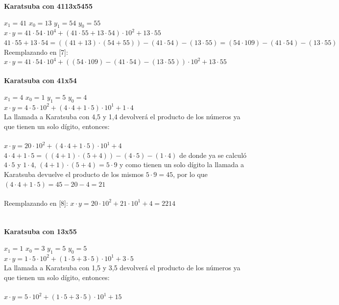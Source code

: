 \documentclass[titlepage,a4paper]{article}
\begin{document}
\textbf{Karatsuba con  4113x5455} \par
\qquad $x_1=41$ \quad $x_0=13$ \quad $y_1=54$ \quad $y_0=55$ \\
$x\cdot y= 41 \cdot 54 \cdot 10^4 + (41\cdot 55 + 13 \cdot 54)\cdot 10^2 + 13\cdot 55$ \qquad [7] \\

$41\cdot 55 + 13 \cdot 54 = ((41+13)\cdot (54+55)) - (41\cdot 54) - (13\cdot 55) = (54 \cdot 109) - (41\cdot 54) - (13\cdot 55) $ \\

Reemplazando en [7]: \qquad $x\cdot y= 41 \cdot 54 \cdot 10^4 + ((54 \cdot 109) - (41\cdot 54) - (13\cdot 55))\cdot 10^2 + 13\cdot 55$ \\ \\ 


\textbf{Karatsuba con 41x54} \par
\qquad $x_1=4$ \quad $x_0=1$ \quad $y_1=5$ \quad $y_0=4$ \\
$x\cdot y= 4 \cdot 5 \cdot 10^2 + (4\cdot 4 + 1 \cdot 5)\cdot 10^1 + 1\cdot 4$ \\

La llamada a Karatsuba con 4,5 y 1,4 devolverá el producto de los números ya que tienen un solo dígito, entonces: \\ \\
$x\cdot y= 20 \cdot 10^2 + (4\cdot 4 + 1 \cdot 5)\cdot 10^1 + 4$ \qquad [8]\\ 

$4 \cdot4 + 1\cdot5 = ((4+1)\cdot (5+4)) - (4\cdot 5) - (1\cdot 4)$ de donde ya se calculó $4\cdot 5$ y $1\cdot 4$, $(4+1)\cdot (5+4) = 5\cdot9$ y como tienen un solo dígito la llamada a Karatsuba devuelve el producto de los mismos $5\cdot9=45$, por lo que $(4\cdot 4 + 1 \cdot 5) = 45 - 20 - 4 = 21 $ \\ \\ 
Reemplazando en [8]: \qquad $ x\cdot y= 20 \cdot 10^2 + 21\cdot 10^1 + 4 = 2214$ \\ \\ \\ 


\textbf{Karatsuba con 13x55} \par
\qquad $x_1=1$ \quad $x_0=3$ \quad $y_1=5$ \quad $y_0=5$ \\
$x\cdot y= 1 \cdot 5 \cdot 10^2 + (1\cdot 5 + 3 \cdot 5)\cdot 10^1 + 3\cdot 5$ \\

La llamada a Karatsuba con 1,5 y 3,5 devolverá el producto de los números ya que tienen un solo dígito, entonces: \\ \\
$x\cdot y= 5 \cdot 10^2 + (1\cdot 5 + 3 \cdot 5)\cdot 10^1 + 15$ \qquad [9]\\
\end{document}
